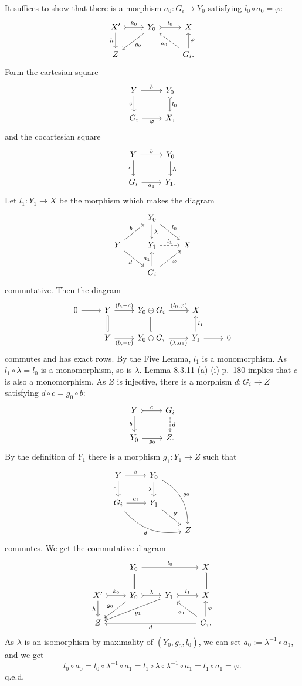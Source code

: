 \documentclass[12pt]{article}
\theoremstyle{remark}
\theoremstyle{definition}
\newcommand{\pp}{\varphi}
\begin{document}
It suffices to show that there is a morphism $a_0:G_i\to Y_0$ satisfying $l_0\circ a_0=\varphi$:
$$
\begin{tikzcd}
X'\ar{d}[swap]{h}\ar[tail]{r}{k_0}&Y_0\ar{dl}{g_0}\ar[tail]{r}{l_0}&X\\ 
Z&&G_i.\ar[dashed]{ul}{a_0}\ar{u}[swap]{\varphi}
\end{tikzcd}
$$ 
Form the cartesian square 
$$
\begin{tikzcd}
Y\ar{r}{b}\ar[swap]{d}{c}&Y_0\ar[tail]{d}{l_0}\\
G_i\ar[swap]{r}{\varphi}&X,
\end{tikzcd}
$$
and the cocartesian square 
$$
\begin{tikzcd}
Y\ar{r}{b}\ar[swap]{d}{c}&Y_0\ar{d}{\lambda}\\
G_i\ar[swap]{r}{a_1}&Y_1.
\end{tikzcd}
$$ 
Let $l_1:Y_1\to X$ be the morphism which makes the diagram 
$$
\begin{tikzcd}
{}&Y_0\ar{d}{\lambda}\ar{dr}{l_0}\\ 
Y\ar{ur}{b}\ar{dr}[swap]{d}&Y_1\ar[dashed]{r}{l_1}&X\\ 
{}&G_i\ar{u}{a_1}\ar{ru}[swap]{\pp}
\end{tikzcd}
$$ 
commutative. Then the diagram 
$$
\begin{tikzcd}
0\ar{r}&Y\ar[equal]{d}\ar{r}{(b,-c)}&Y_0\oplus G_i\ar[equal]{d}\ar{r}{(l_0,\varphi)}&X\\
&Y\ar{r}[swap]{(b,-c)}&Y_0\oplus G_i\ar{r}[swap]{(\lambda,a_1)}&Y_1\ar{r}\ar{u}[swap]{l_1}&0
\end{tikzcd}
$$ 
commutes and has exact rows. By the Five Lemma, $l_1$ is a monomorphism. As $l_1\circ\lambda=l_0$ is a monomorphism, so is $\lambda$. Lemma 8.3.11 (a) (i) p.~180 implies that $c$ is also a monomorphism. As $Z$ is injective, there is a morphism $d:G_i\to Z$ satisfying $d\circ c=g_0\circ b$:
$$
\begin{tikzcd}
Y\ar{d}[swap]{b}\ar[tail]{r}{c}&G_i\ar[dashed]{d}{d}\\ 
Y_0\ar{r}[swap]{g_0}&Z.
\end{tikzcd}
$$ 
By the definition of $Y_1$ there is a morphism $g_1:Y_1\to Z$ such that 
$$
\begin{tikzcd}
Y\ar{r}{b}\ar[swap]{d}{c}&Y_0\ar{d}[swap]{\lambda}\ar[bend left]{ddr}{g_0}\\
G_i\ar{r}{a_1}\ar[bend right]{rrd}[swap]{d}&Y_1\ar{dr}{g_1}\\ 
{}&{}&Z
\end{tikzcd}
$$ 
commutes. We get the commutative diagram
$$
\begin{tikzcd}
{}&Y_0\ar[equal]{d}\ar{rr}{l_0}&&X\ar[equal]{d}\\ 
X'\ar{d}[swap]{h}\ar[tail]{r}{k_0}&Y_0\ar{dl}[swap]{g_0}\ar[tail]{r}{\lambda}&Y_1\ar{dll}{g_1}\ar[tail]{r}{l_1}&X\\ 
Z&&&G_i.\ar{u}[swap]{\varphi}\ar{lll}{d}\ar{ul}{a_1}
\end{tikzcd}
$$ 
As $\lambda$ is an isomorphism by maximality of $(Y_0,g_0,l_0)$, we can set $a_0:=\lambda^{-1}\circ a_1$, and we get 
$$
l_0\circ a_0=l_0\circ\lambda^{-1}\circ a_1=l_1\circ\lambda\circ\lambda^{-1}\circ a_1=l_1\circ a_1=\pp.
$$ 
q.e.d.
%
%
\end{document}
